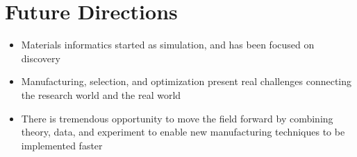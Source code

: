 \section{Future Directions}
\begin{itemize}
\item Materials informatics started as simulation, and has been focused on discovery
\item Manufacturing, selection, and optimization present real challenges connecting the research world and the real world
\item There is tremendous opportunity to move the field forward by combining theory, data, and experiment to enable new manufacturing techniques to be implemented faster
\end{itemize}
